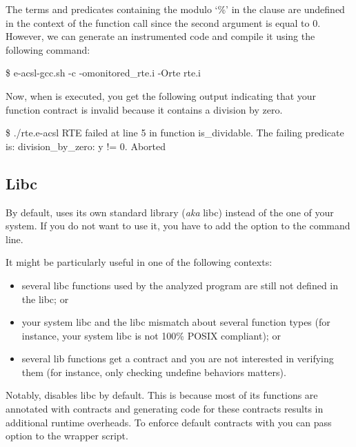 The terms and predicates containing the modulo `\%' in the  clause
are undefined in the context of the  function call since the second
argument is equal to 0.  However, we can generate an instrumented code and
compile it using the following command:

\begin{shell}
\$ e-acsl-gcc.sh -c -omonitored_rte.i -Orte rte.i
\end{shell}

Now, when  is executed, you get the following output indicating
that your function contract is invalid because it contains a division by zero.

\begin{shell}
\$ ./rte.e-acsl
RTE failed at line 5 in function is_dividable.
The failing predicate is:
division_by_zero: y != 0.
Aborted
\end{shell}


\subsection{Libc}

By default, \framac uses its own standard library (\emph{aka} libc) instead of
the one of your system. If you do not want to use it, you have to add the option
 to the \framac command
line.

It might be particularly useful in one of the following contexts:
\begin{itemize}
  \item several libc functions used by the analyzed program are still not defined
        in the \framac libc; or
  \item your system libc and the \framac libc mismatch about several function
        types (for instance, your system libc is not 100\% POSIX compliant); or
  \item several \framac lib functions get a contract and you are not interested in
        verifying them (for instance, only checking undefine behaviors matters).
\end{itemize}

\begin{important}
  Notably, \eacslgcc disables \framac libc by default. This is because most of
  its functions are annotated with \eacsl contracts and generating code for
  these contracts results in additional runtime overheads. To enforce default
  \framac contracts with \eacslgcc you can pass  option to the wrapper
  script.
\end{important}

